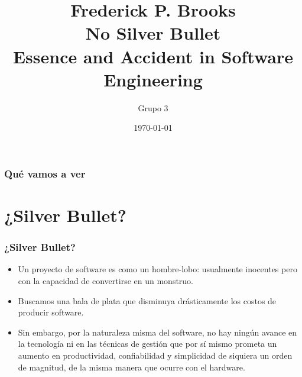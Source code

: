 \documentclass{beamer}
\title[No Silver Bullet]{Frederick P. Brooks \\ No Silver Bullet \\ Essence and Accident in Software Engineering} %
\author{Grupo 3} %
\institute[UBA - ISW2] %
{
Ingeniería de Software II - 1er Cuatrimestre 2016 \\ %
\medskip
\textit{} %
}
\date{\today} %
\begin{document}
\begin{frame}
\titlepage %
\end{frame}

\begin{frame}
\frametitle{Qué vamos a ver} %
\tableofcontents %
\end{frame}


\section{¿Silver Bullet?}
\begin{frame}
\frametitle{¿Silver Bullet?}

\begin{itemize}

\item Un proyecto de software es como un hombre-lobo: usualmente inocentes pero con la capacidad de convertirse en un monstruo.\\
\item Buscamos una bala de plata que disminuya drásticamente los costos de producir software.\\
\item Sin embargo, por la naturaleza misma del software, no hay ningún avance en la tecnología ni en las técnicas de gestión que por sí mismo prometa un aumento en productividad, confiabilidad y simplicidad de siquiera un orden de magnitud, de la misma manera que ocurre con el hardware.\\
\end{itemize}

\end{frame}
\end{document}
